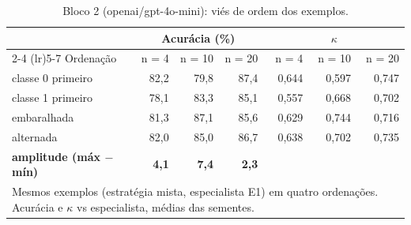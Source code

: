 \begin{table}[htbp]
\centering
\small
\caption{Bloco 2 (openai/gpt-4o-mini): viés de ordem dos exemplos.}
\label{tab:bloco2_E1_ordem_exemplos_gpt4mini}
\begin{tabular}{lrrrrrr}
\toprule
 & \multicolumn{3}{c}{Acurácia (\%)} & \multicolumn{3}{c}{$\kappa$} \\ \cmidrule(lr){2-4} \cmidrule(lr){5-7}
Ordenação & n = 4 & n = 10 & n = 20 & n = 4 & n = 10 & n = 20 \\
\midrule
classe 0 primeiro & 82,2 & 79,8 & 87,4 & 0,644 & 0,597 & 0,747 \\
classe 1 primeiro & 78,1 & 83,3 & 85,1 & 0,557 & 0,668 & 0,702 \\
embaralhada & 81,3 & 87,1 & 85,6 & 0,629 & 0,744 & 0,716 \\
alternada & 82,0 & 85,0 & 86,7 & 0,638 & 0,702 & 0,735 \\
\midrule
\textbf{amplitude (máx $-$ mín)} & \textbf{4,1} & \textbf{7,4} & \textbf{2,3} &  &  &  \\
\bottomrule
\multicolumn{7}{p{0.95\linewidth}}{\footnotesize Mesmos exemplos (estratégia mista, especialista E1) em quatro ordenações. Acurácia e $\kappa$ vs especialista, médias das sementes.} \\
\end{tabular}
\end{table}
